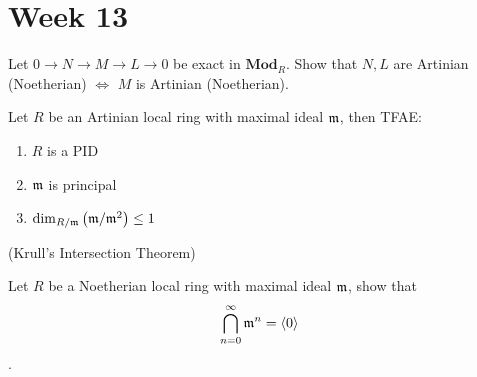 
\section{Week 13}

\begin{exercise}
  Let $0 \to N \to M \to L \to 0$ be exact in $\mathbf{Mod}_R$.
  Show that $N, L$ are Artinian (Noetherian) $\iff$ $M$ is Artinian (Noetherian).
\end{exercise}

\begin{exercise}
  Let $R$ be an Artinian local ring with maximal ideal $\mathfrak{m}$, 
  then TFAE:
  \begin{enumerate}
    \item $R$ is a PID
    \item $\mathfrak{m}$ is principal
    \item $\dim_{R/\mathfrak{m}} \left( \mathfrak{m}/\mathfrak{m}^2 \right) \leq 1$
  \end{enumerate}
\end{exercise}

\begin{exercise}{(Krull's Intersection Theorem)}

  Let $R$ be a Noetherian local ring with maximal ideal $\mathbb{\mathfrak{m}}$, 
  show that $$\bigcap\limits_{n=0}^{\infty} \mathfrak{m}^n = \langle 0 \rangle$$.
\end{exercise}
